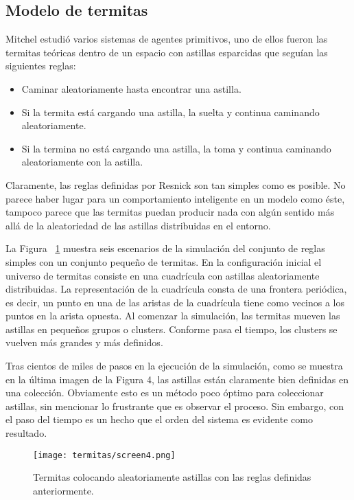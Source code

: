 \subsection{Modelo de termitas}
Mitchel \cite{Resnick1994} estudió varios sistemas de agentes primitivos, uno de ellos fueron las termitas teóricas dentro de un espacio con astillas esparcidas que seguían las siguientes reglas:

\begin{itemize}
  \item Caminar aleatoriamente hasta encontrar una astilla.
  \item Si la termita está cargando una astilla, la suelta y continua caminando aleatoriamente.
  \item Si la termina no está cargando una astilla, la toma y continua caminando aleatoriamente con la astilla.
\end{itemize}

Claramente, las reglas definidas por Resnick son tan simples como es posible. No parece haber lugar para un comportamiento inteligente en un modelo como éste, tampoco parece que las termitas puedan producir nada con algún sentido más allá de la aleatoriedad de las astillas distribuidas en el entorno.\par

La Figura ~\ref{fig:termitasaleatorias} muestra seis escenarios de la simulación del conjunto de reglas simples con un conjunto pequeño de termitas. En la configuración inicial el universo de termitas consiste en una cuadrícula con astillas aleatoriamente distribuidas. La representación de la cuadrícula consta de una frontera periódica, es decir, un punto en una de las aristas de la cuadrícula tiene como vecinos a los puntos en la arista opuesta.
Al comenzar la simulación, las termitas mueven las astillas en pequeños grupos o clusters. Conforme pasa el tiempo, los clusters se vuelven más grandes y más definidos.\par

Tras cientos de miles de pasos en la ejecución de la simulación, como se muestra en la última imagen de la Figura 4, las astillas están claramente bien definidas en una colección. Obviamente esto es un método poco óptimo para coleccionar astillas, sin mencionar lo frustrante que es observar el proceso. Sin embargo, con el paso del tiempo es un hecho que el orden del sistema es evidente como resultado.\par

\begin{figure}
  \centering
  \texttt{[image: termitas/screen4.png]}
  \caption{Termitas colocando aleatoriamente astillas con las reglas definidas anteriormente.}
  \label{fig:termitasaleatorias}
\end{figure}

